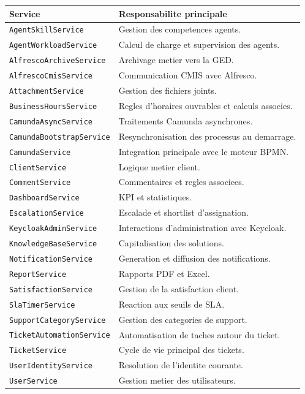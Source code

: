 \documentclass[12pt,a4paper,oneside]{report}
\begin{document}
\begin{longtable}{>{\raggedright\arraybackslash}p{4.7cm} >{\raggedright\arraybackslash}p{8.8cm}}
\toprule
Service & Responsabilite principale \\
\midrule
\texttt{AgentSkillService} & Gestion des competences agents. \\
\texttt{AgentWorkloadService} & Calcul de charge et supervision des agents. \\
\texttt{AlfrescoArchiveService} & Archivage metier vers la GED. \\
\texttt{AlfrescoCmisService} & Communication CMIS avec Alfresco. \\
\texttt{AttachmentService} & Gestion des fichiers joints. \\
\texttt{BusinessHoursService} & Regles d'horaires ouvrables et calculs associes. \\
\texttt{CamundaAsyncService} & Traitements Camunda asynchrones. \\
\texttt{CamundaBootstrapService} & Resynchronisation des processus au demarrage. \\
\texttt{CamundaService} & Integration principale avec le moteur BPMN. \\
\texttt{ClientService} & Logique metier client. \\
\texttt{CommentService} & Commentaires et regles associees. \\
\texttt{DashboardService} & KPI et statistiques. \\
\texttt{EscalationService} & Escalade et shortlist d'assignation. \\
\texttt{KeycloakAdminService} & Interactions d'administration avec Keycloak. \\
\texttt{KnowledgeBaseService} & Capitalisation des solutions. \\
\texttt{NotificationService} & Generation et diffusion des notifications. \\
\texttt{ReportService} & Rapports PDF et Excel. \\
\texttt{SatisfactionService} & Gestion de la satisfaction client. \\
\texttt{SlaTimerService} & Reaction aux seuils de SLA. \\
\texttt{SupportCategoryService} & Gestion des categories de support. \\
\texttt{TicketAutomationService} & Automatisation de taches autour du ticket. \\
\texttt{TicketService} & Cycle de vie principal des tickets. \\
\texttt{UserIdentityService} & Resolution de l'identite courante. \\
\texttt{UserService} & Gestion metier des utilisateurs. \\
\bottomrule
\end{longtable}
\end{document}
